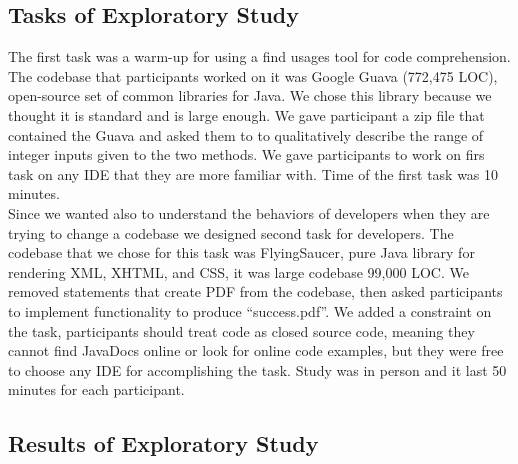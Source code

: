 \documentclass[conference]{IEEEtran}
\begin{document}
\subsection{Tasks of Exploratory Study}
The first task was a warm-up for using a find usages tool for code comprehension. The codebase that participants worked on it was Google Guava (772,475 LOC), open-source set of common libraries for Java. We chose this library because we thought it is standard and is large enough. We gave participant a zip file that contained the Guava and asked them to to qualitatively describe the range of integer inputs given to the two methods. We gave participants to work on firs task on any IDE that they are more familiar with. Time of the first task was 10 minutes.\\
Since we wanted also to understand the behaviors of developers when they are trying to change a codebase we designed second task for developers. The codebase that we chose for this task was FlyingSaucer, pure Java library for rendering XML, XHTML, and CSS, it was large codebase 99,000 LOC. We removed statements that create PDF from the codebase, then asked participants to implement functionality to produce “success.pdf”. We added a constraint on the task, participants should treat code as closed source code, meaning they cannot find JavaDocs online or look for online code examples, but they were free to choose any IDE for accomplishing the task. Study was in person and it last 50 minutes for each participant. 
\subsection{Results of Exploratory Study}
\end{document}
